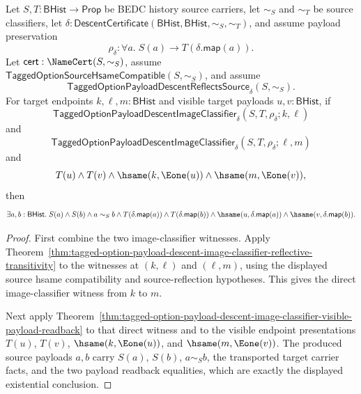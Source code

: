\begin{theorem}
\label{thm:tagged-option-payload-descent-image-classifier-reflective-transitive-visible-payload-readback}
Let $S,T:\mathsf{BHist}\to\mathsf{Prop}$ be BEDC history source carriers, let
$\sim_S$ and $\sim_T$ be source classifiers, let
$\delta:\mathsf{DescentCertificate}(\mathsf{BHist},\mathsf{BHist},\sim_S,\sim_T)$,
and assume payload preservation
$$
\rho_{\delta}:\forall a.\;S(a)\to T(\delta.\mathsf{map}(a)).
$$
Let $\mathsf{cert}:\NameCert(S,\sim_S)$, assume
$\mathsf{TaggedOptionSourceHsameCompatible}(S,\sim_S)$, and assume
$$
\mathsf{TaggedOptionPayloadDescentReflectsSource}_{\delta}(S,\sim_S).
$$
For target endpoints $k,\ell,m:\mathsf{BHist}$ and visible target payloads
$u,v:\mathsf{BHist}$, if
$$
\mathsf{TaggedOptionPayloadDescentImageClassifier}_{\delta}
(S,T,\rho_{\delta};k,\ell)
$$
and
$$
\mathsf{TaggedOptionPayloadDescentImageClassifier}_{\delta}
(S,T,\rho_{\delta};\ell,m)
$$
and
$$
T(u)\land T(v)\land
\hsame(k,\Eone(u))\land
\hsame(m,\Eone(v)),
$$
then
$$
\exists a,b:\mathsf{BHist}.\;
S(a)\land S(b)\land a\sim_S b\land
T(\delta.\mathsf{map}(a))\land T(\delta.\mathsf{map}(b))\land
\hsame(u,\delta.\mathsf{map}(a))\land
\hsame(v,\delta.\mathsf{map}(b)).
$$
\end{theorem}
\begin{proof}
First combine the two image-classifier witnesses. Apply
Theorem~\ref{thm:tagged-option-payload-descent-image-classifier-reflective-transitivity}
to the witnesses at $(k,\ell)$ and $(\ell,m)$, using the displayed source
hsame compatibility and source-reflection hypotheses. This gives the direct
image-classifier witness from $k$ to $m$.

Next apply
Theorem~\ref{thm:tagged-option-payload-descent-image-classifier-visible-payload-readback}
to that direct witness and to the visible endpoint presentations
$T(u)$, $T(v)$, $\hsame(k,\Eone(u))$, and $\hsame(m,\Eone(v))$. The produced
source payloads $a,b$ carry $S(a)$, $S(b)$, $a\sim_S b$, the transported target
carrier facts, and the two payload readback equalities, which are exactly the
displayed existential conclusion.
\end{proof}

